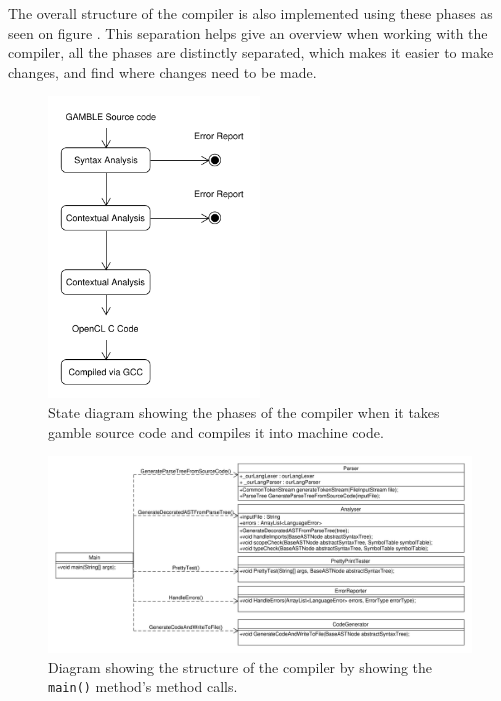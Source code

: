 The overall structure of the compiler is also implemented using these phases as seen on figure .
This separation helps give an overview when working with the compiler, all the phases are distinctly separated, which makes it easier to make changes, and find where changes need to be made.

\begin{figure}[ht]
\centering
\includegraphics[width=0.5\textwidth]{figures/ClassDiagrams/CompilerDiagram.pdf}
\caption{State diagram showing the phases of the compiler when it takes \gls{gamble} source code and compiles it into machine code.}\label{fig:phases}
\end{figure}

\begin{figure}[t]
	\begin{sideways}
		\begin{minipage}{22.5cm}
			\includegraphics[height=0.42\textheight]{figures/ClassDiagrams/DiagramOfCallsFromMain.pdf}
		\end{minipage}
	\end{sideways}
	\centering
	\caption{Diagram showing the structure of the compiler by showing the \texttt{main()} method's method calls.}\label{fig:compilerOverview}
\end{figure}


